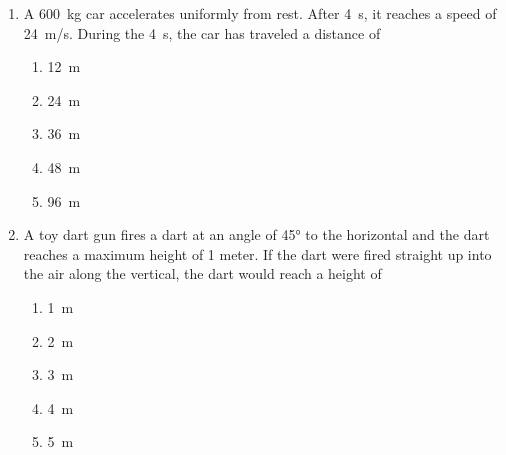 \documentclass{../../../oss-apphys}
\begin{document}
\begin{multicols}{2}
\begin{enumerate}[resume,leftmargin=18pt]
  \item A \SI{600}{\kilo\gram} car accelerates uniformly from rest. After
    \SI{4}{\second}, it reaches a speed of \SI{24}{m/s}. During the
    \SI{4}{\second}, the car has traveled a distance of
    \begin{enumerate}[noitemsep,topsep=0pt,leftmargin=18pt,label=(\Alph*)]
    \item\SI{12}{\metre}
    \item\SI{24}{\metre}
    \item\SI{36}{\metre}
    \item\SI{48}{\metre}
    \item\SI{96}{\metre}
    \end{enumerate}

  \item A toy dart gun fires a dart at an angle of \ang{45} to the
    horizontal and the dart reaches a maximum height of 1 meter. If the dart
    were fired straight up into the air along the vertical, the dart would
    reach a height of
    \begin{enumerate}[noitemsep,topsep=0pt,leftmargin=18pt,label=(\Alph*)]
    \item\SI{1}{\metre}
    \item\SI{2}{\metre}
    \item\SI{3}{\metre}
    \item\SI{4}{\metre}
    \item\SI{5}{\metre}
    \end{enumerate}
    
      

\end{enumerate}
\end{multicols}
\end{document}
